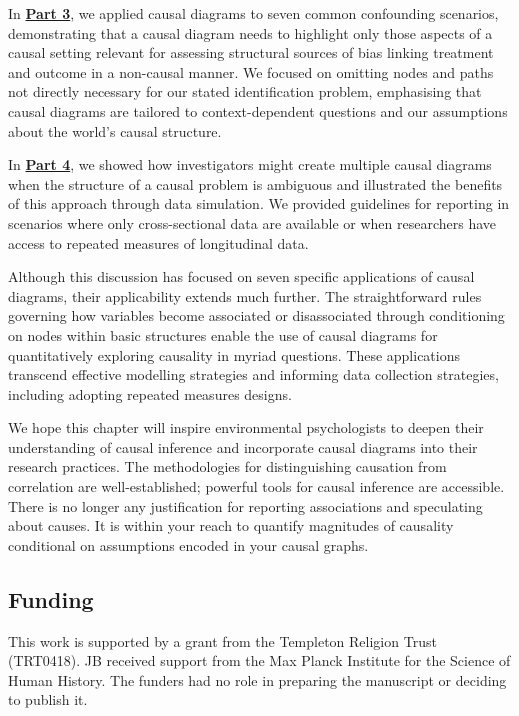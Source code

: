 \documentclass[
  singlecolumn]{article}
\begin{document}
In \hyperref[section-part3]{\textbf{Part 3}}, we applied causal diagrams
to seven common confounding scenarios, demonstrating that a causal
diagram needs to highlight only those aspects of a causal setting
relevant for assessing structural sources of bias linking treatment and
outcome in a non-causal manner. We focused on omitting nodes and paths
not directly necessary for our stated identification problem,
emphasising that causal diagrams are tailored to context-dependent
questions and our assumptions about the world's causal structure.

In \hyperref[section-part4]{\textbf{Part 4}}, we showed how
investigators might create multiple causal diagrams when the structure
of a causal problem is ambiguous and illustrated the benefits of this
approach through data simulation. We provided guidelines for reporting
in scenarios where only cross-sectional data are available or when
researchers have access to repeated measures of longitudinal data.

Although this discussion has focused on seven specific applications of
causal diagrams, their applicability extends much further. The
straightforward rules governing how variables become associated or
disassociated through conditioning on nodes within basic structures
enable the use of causal diagrams for quantitatively exploring causality
in myriad questions. These applications transcend effective modelling
strategies and informing data collection strategies, including adopting
repeated measures designs.

We hope this chapter will inspire environmental psychologists to deepen
their understanding of causal inference and incorporate causal diagrams
into their research practices. The methodologies for distinguishing
causation from correlation are well-established; powerful tools for
causal inference are accessible. There is no longer any justification
for reporting associations and speculating about causes. It is within
your reach to quantify magnitudes of causality conditional on
assumptions encoded in your causal graphs.

\newpage{}

\subsection{Funding}\label{funding}

This work is supported by a grant from the Templeton Religion Trust
(TRT0418). JB received support from the Max Planck Institute for the
Science of Human History. The funders had no role in preparing the
manuscript or deciding to publish it.
\end{document}
